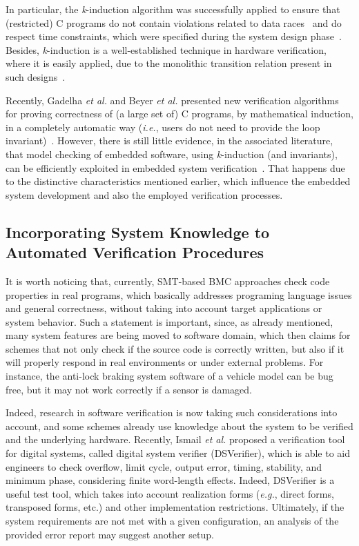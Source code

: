 \documentclass{acm_sen_article}
\begin{document}
In particular, the \textit{k}-induction algorithm was successfully applied to ensure that (restricted) C programs do not contain violations related to data races~\cite{Donaldson10,Kinductor} and do respect time constraints, which were specified during the system design phase~\cite{EenS03}. Besides, \textit{k}-induction is a well-established technique in hardware verification, where it is easily applied, due to the monolithic transition relation present in such designs~\cite{EenS03,GrosseLD09,Sheera00}. 

Recently, Gadelha {\it et al.} and Beyer {\it et al.} presented new verification algorithms for proving correctness of (a large set of) C programs, by mathematical induction, in a completely automatic way ({\it i.e.}, users do not need to provide the loop invariant)~\cite{Gadelha15,Beyer15}. However, there is still little evidence, in the associated literature, that model checking of embedded software, using \textit{k}-induction (and invariants), can be efficiently exploited in embedded system verification~\cite{Rocha15,Brain15}. That happens due to the distinctive characteristics mentioned earlier, which influence the embedded system development and also the employed verification processes.

\subsection{Incorporating System Knowledge to Automated Verification Procedures}

It is worth noticing that, currently, SMT-based BMC approaches check code properties in real programs, which basically addresses programing language issues and general correctness, without taking into account target applications or system behavior. Such a statement is important, since, as already mentioned, many system features are being moved to software domain, which then claims for schemes that not only check if the source code is correctly written, but also if it will properly respond in real environments or under external problems. For instance, the anti-lock braking system software of a vehicle model can be bug free, but it may not work correctly if a sensor is damaged.

Indeed, research in software verification is now taking such considerations into account, and some schemes already use knowledge about the system to be verified and the underlying hardware. Recently, Ismail {\it et al.} \cite{dsv_spin2015}  proposed a verification tool for digital systems, called digital system verifier (DSVerifier), which is able to aid engineers to check overflow, limit cycle, output error, timing, stability, and minimum phase, considering finite word-length effects. Indeed, DSVerifier is a useful test tool, which takes into account realization forms ({\it e.g.}, direct forms, transposed forms, etc.) and other implementation restrictions. Ultimately, if the system requirements are not met with a given configuration, an analysis of the provided error report may suggest another setup. 
\end{document}

